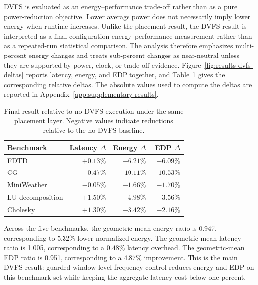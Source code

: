 DVFS is evaluated as an energy--performance trade-off rather than as a pure
power-reduction objective. Lower average power does not necessarily imply lower
energy when runtime increases. Unlike the placement result, the DVFS result is
interpreted as a final-configuration energy--performance measurement rather
than as a repeated-run statistical comparison. The analysis therefore
emphasizes multi-percent energy changes and treats sub-percent changes as
near-neutral unless they are supported by power, clock, or trade-off evidence.
Figure~\ref{fig:results-dvfs-deltas} reports latency, energy, and EDP
together, and Table~\ref{tab:results-dvfs-energy} gives the corresponding
relative deltas. The absolute values used to compute the deltas are reported
in Appendix~\ref{app:supplementary-results}.

\figDvfsDeltas

\begin{table}[!htbp]
\centering
\begingroup
\footnotesize
\begin{tabular}{@{}lrrr@{}}
\toprule
Benchmark & Latency \(\Delta\) & Energy \(\Delta\) & EDP \(\Delta\) \\
\midrule
FDTD & \(+0.13\%\) & \(-6.21\%\) & \(-6.09\%\) \\
CG & \(-0.47\%\) & \(-10.11\%\) & \(-10.53\%\) \\
MiniWeather & \(-0.05\%\) & \(-1.66\%\) & \(-1.70\%\) \\
LU decomposition & \(+1.50\%\) & \(-4.98\%\) & \(-3.56\%\) \\
Cholesky & \(+1.30\%\) & \(-3.42\%\) & \(-2.16\%\) \\
\bottomrule
\end{tabular}
\endgroup
\caption{Final \WinDVFS{} result relative to no-DVFS execution under the same placement layer. Negative values indicate reductions relative to the no-DVFS baseline.}
\label{tab:results-dvfs-energy}
\end{table}

Across the five benchmarks, the geometric-mean energy ratio is
0.947, corresponding to \(5.32\%\) lower normalized energy. The
geometric-mean latency ratio is 1.005, corresponding to a \(0.48\%\)
latency overhead. The geometric-mean EDP ratio is 0.951, corresponding to a
\(4.87\%\) improvement. This is the main DVFS result: guarded window-level
frequency control reduces energy and EDP on this benchmark set while keeping
the aggregate latency cost below one percent.

\figDvfsTradeoff

